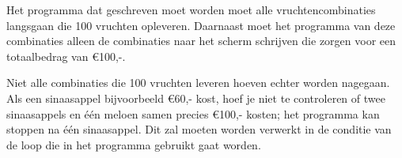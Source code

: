 Het programma dat geschreven moet worden moet alle vruchtencombinaties langsgaan die 100 vruchten opleveren. Daarnaast moet het programma van deze combinaties alleen de combinaties naar het scherm schrijven die zorgen voor een totaalbedrag van \euro 100,-.

Niet alle combinaties die 100 vruchten leveren hoeven echter worden nagegaan. Als een sinaasappel bijvoorbeeld \euro60,- kost, hoef je niet te controleren of twee sinaasappels en \'e\'en meloen samen precies \euro 100,- kosten; het programma kan stoppen na \'e\'en sinaasappel. Dit zal moeten worden verwerkt in de conditie van de loop die in het programma gebruikt gaat worden.